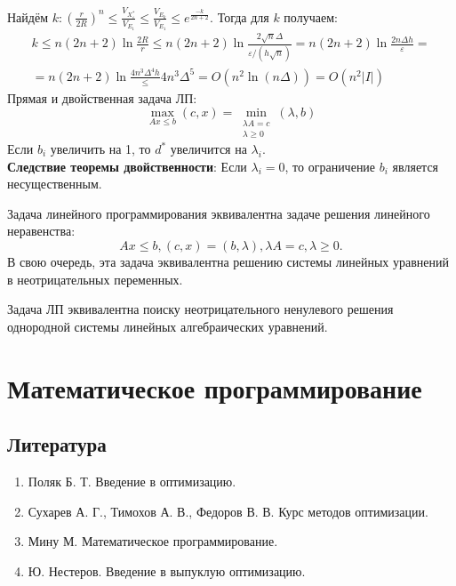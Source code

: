 \documentclass[11pt]{article}
\def\zall{\setcounter{lem}{0}\setcounter{cnsqnc}{0}\setcounter{th}{0}\setcounter{Cmt}{0}\setcounter{equation}{0}\setcounter{stnmt}{0}}
\newcounter{lem}\setcounter{lem}{0}
\newcounter{th}\setcounter{th}{0}
\newcounter{cnsqnc}\setcounter{cnsqnc}{0}
\def\cnsqnc{\par\smallskip\refstepcounter{cnsqnc}\textbf{\arabic{cnsqnc}}}
\newtheorem*{Consequence}{Следствие \cnsqnc}
\newcounter{Cmt}\setcounter{Cmt}{0}
\newcounter{stnmt}\setcounter{stnmt}{0}
\def\st{\par\smallskip\refstepcounter{stnmt}\textbf{\arabic{stnmt}}}
\newtheorem*{Statement}{Утверждение \st}
\begin{document}
Найдём $k: \left(\frac{r}{2R}\right)^n \leq \frac{V_{X^*_{\varepsilon}}}{V_{E_1}} \leq \frac{V_{E_k}}{V_{E_1}} \leq e^{\frac{-k}{2n + 2}}$.
Тогда для $k$ получаем:
\begin{multline}
k \leq n(2n + 2)\ln\frac{2R}{r} \leq n(2n + 2)\ln\frac{2\sqrt{n}\Delta}{\varepsilon/(h\sqrt{n})} =
n(2n + 2)\ln\frac{2n\Delta h}{\varepsilon} = \\
= n(2n + 2)\ln\frac{4n^3\Delta^4h} \leq 4n^3\Delta^5
= O(n^2\ln(n\Delta)) = O(n^2|I|)
\end{multline}
Прямая и двойственная задача ЛП:
\begin{equation}
\max_{Ax \leq b}(c, x) = \min_{\substack{\lambda A = c \\ \lambda \geq 0}}(\lambda, b)
\end{equation}
Если $b_i$ увеличить на 1, то $d^*$ увеличится на $\lambda_i$.\\

\textbf{Следствие теоремы двойственности}:
Если $\lambda_i = 0$, то ограничение $b_i$ является несущественным.

\begin{Statement}
Задача линейного программирования эквивалентна задаче решения линейного неравенства:
\begin{equation}
Ax \leq b, (c, x) = (b, \lambda), \lambda A = c, \lambda \geq 0.
\end{equation}
В свою очередь, эта задача эквивалентна решению системы линейных уравнений в неотрицательных
переменных.
\end{Statement}
\begin{Consequence}
Задача ЛП эквивалентна поиску неотрицательного ненулевого решения однородной системы линейных
алгебраических уравнений.
\end{Consequence}
\section{Математическое программирование}
\label{sec:orgf2e46f6}
\zall
\subsection{Литература}
\label{sec:orgd630f92}
\begin{enumerate}
\item Поляк Б. Т. Введение в оптимизацию.
\item Сухарев А. Г., Тимохов А. В., Федоров В. В. Курс методов оптимизации.
\item Мину М. Математическое программирование.
\item Ю. Нестеров. Введение в выпуклую оптимизацию.
\end{enumerate}
\end{document}
